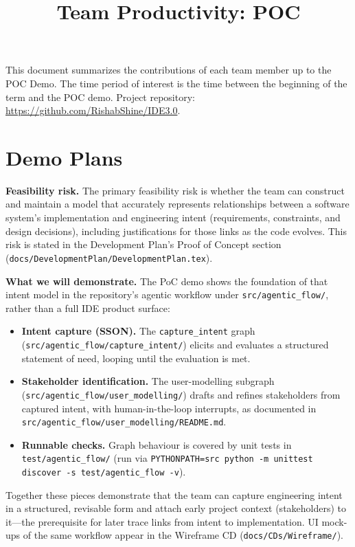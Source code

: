 \documentclass{article}
\title{Team Productivity: POC\\\progname}
\author{\authname}
\date{}
\begin{document}
\maketitle

This document summarizes the contributions of each team member up to the POC
Demo.  The time period of interest is the time between the beginning of the term
and the POC demo. Project repository:
\href{https://github.com/RishabShine/IDE3.0}{https://github.com/RishabShine/IDE3.0}.

\section{Demo Plans}

\noindent\textbf{Feasibility risk.}
The primary feasibility risk is whether the team can construct and maintain a
model that accurately represents relationships between a software system's
implementation and engineering intent (requirements, constraints, and design
decisions), including justifications for those links as the code evolves. This
risk is stated in the Development Plan's Proof of Concept section
(\texttt{docs/DevelopmentPlan/DevelopmentPlan.tex}).

\noindent\textbf{What we will demonstrate.}
The PoC demo shows the foundation of that intent model in the repository's
agentic workflow under \texttt{src/agentic\_flow/}, rather than a full IDE
product surface:

\begin{itemize}
  \item \textbf{Intent capture (SSON).} The
    \texttt{capture\_intent} graph
    (\texttt{src/agentic\_flow/capture\_intent/}) elicits and evaluates a
    structured statement of need, looping until the evaluation is met.
  \item \textbf{Stakeholder identification.} The user-modelling subgraph
    (\texttt{src/agentic\_flow/user\_modelling/}) drafts and refines
    stakeholders from captured intent, with human-in-the-loop interrupts, as
    documented in
    \texttt{src/agentic\_flow/user\_modelling/README.md}.
  \item \textbf{Runnable checks.} Graph behaviour is covered by unit tests in
    \texttt{test/agentic\_flow/} (run via
    \texttt{PYTHONPATH=src python -m unittest discover -s test/agentic\_flow -v}).
\end{itemize}

Together these pieces demonstrate that the team can capture engineering intent
in a structured, revisable form and attach early project context (stakeholders)
to it---the prerequisite for later trace links from intent to implementation.
UI mock-ups of the same workflow appear in the Wireframe CD
(\texttt{docs/CDs/Wireframe/}).
\end{document}
